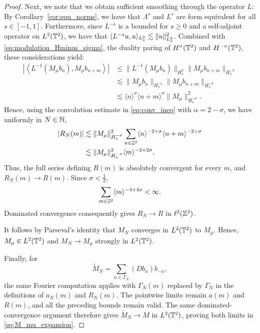 \begin{proof}
    Next, we note that we obtain sufficient smoothing through the operator $L$: By Corollary~\ref{cor:equ_norms}, we have that $\Lambda^s$ and $L^s$ are form equivalent for all $s\in [-1,1]$.
    Furthermore, since $L^{-s}$ is a bounded for $s \geq 0$ and a self-adjoint operator on $L^2(\mathbb{T}^2)$, we have that $\langle L^{-s} u, u \rangle_{L^2_x} \lesssim \|u\|^2_{L^2_x}$.
    Combined with \eqref{eq:modulation_Hminus_sigma}, the duality paring of $H^{\sigma}(\mathbb{T}^2)$ and $H^{-\sigma}(\mathbb{T}^2)$, these considerations yield:
    \begin{align*}
        \left|
        \left\langle
            L^{-1}(M_\mu b_n),
            M_\mu b_{n+m}
        \right\rangle
        \right|
        &\leq
        \|L^{-1}(M_\mu b_n)\|_{H^\sigma_x}
        \|M_\mu b_{n+m}\|_{H^{-\sigma}_x}
        \\
        &\lesssim
        \|M_\mu b_n\|_{H^{-1}_x}
        \|M_\mu b_{n+m}\|_{H^{-\sigma}_x}
        \\
        &\lesssim
        \langle n\rangle^\sigma
        \langle n+m\rangle^\sigma
        \|M_\mu\|_{H^{-\sigma}_x}^2.
    \end{align*}
    Hence, using the convolution estimate in \eqref{eq:conv_ineq} with $\alpha = 2-\sigma$, we have uniformly in \(N \in \mathbb{N}\),
    \begin{align}\label{eq:R_N_uniform_bound}
        |R_N(m)|
        &\lesssim
        \|M_\mu\|_{H^{-\sigma}_x}^2
        \sum_{n\in\mathbb{Z}^2}
        \langle n\rangle^{-2+\sigma}
        \langle n+m\rangle^{-2+\sigma}
        \nonumber\\
        &\lesssim
        \|M_\mu\|_{H^{-\sigma}_x}^2
        \langle m\rangle^{-2+2\sigma}.
    \end{align}
    Thus, the full series defining $R(m)$ is absolutely
    convergent for every $m$, and $R_N(m)\to R(m)$.
    Since $\sigma<\frac12$,
    \[
        \sum_{m\in\mathbb{Z}^2}\langle m\rangle^{-4+4\sigma}<\infty.
    \]
    Dominated convergence consequently gives
    $R_N\to R$ in $\ell^2(\mathbb{Z}^2)$.

    It follows by Parseval's identity that $M_N$ converges
    in $L^2(\mathbb{T}^2)$ to $M_\mu$. Hence, $M_\mu\in L^2(\mathbb{T}^2)$ and
    $M_N\to M_\mu$ strongly in $L^2(\mathbb{T}^2)$.


    Finally, for
    \[
        \widetilde M_N
        =
        \sum_{n\in\Gamma_N}(Db_n)b_{-n},
    \]
    the same Fourier computation applies with
    $\Gamma_N(m)$ replaced by $\Gamma_N$ in the definitions
    of $a_N(m)$ and $R_N(m)$.
    The pointwise limits remain $a(m)$ and $R(m)$, and
    all the preceding bounds remain valid.
    The same dominated-convergence argument therefore
    gives $\widetilde M_N\to M$ in $L^2(\mathbb{T}^2)$, proving
    both limits in \eqref{eq:M_mu_expansion}.

\end{proof}


